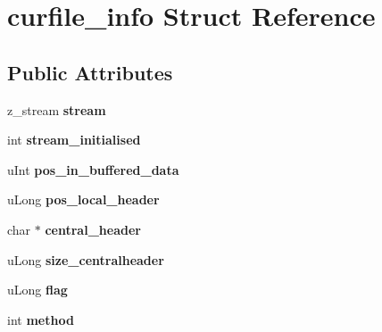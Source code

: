 \hypertarget{structcurfile__info}{\section{curfile\-\_\-info Struct Reference}
\label{structcurfile__info}
}
\subsection*{Public Attributes}
\begin{DoxyCompactItemize}
\item 
\hypertarget{structcurfile__info_a902dbbcce2f8a9b5d5f0ac705f9c914c}{z\-\_\-stream {\bfseries stream}}\label{structcurfile__info_a902dbbcce2f8a9b5d5f0ac705f9c914c}

\item 
\hypertarget{structcurfile__info_a4408645945defb3e3e72fd354d4e98b2}{int {\bfseries stream\-\_\-initialised}}\label{structcurfile__info_a4408645945defb3e3e72fd354d4e98b2}

\item 
\hypertarget{structcurfile__info_ab1e433122ecceb389c8d258830e89f6f}{u\-Int {\bfseries pos\-\_\-in\-\_\-buffered\-\_\-data}}\label{structcurfile__info_ab1e433122ecceb389c8d258830e89f6f}

\item 
\hypertarget{structcurfile__info_ae859aac5711395f5136a26a393f4f3ec}{u\-Long {\bfseries pos\-\_\-local\-\_\-header}}\label{structcurfile__info_ae859aac5711395f5136a26a393f4f3ec}

\item 
\hypertarget{structcurfile__info_a6b8d86737b9297846fc67799c8c42e21}{char $\ast$ {\bfseries central\-\_\-header}}\label{structcurfile__info_a6b8d86737b9297846fc67799c8c42e21}

\item 
\hypertarget{structcurfile__info_a25272deebbc7e9f5f474f4c2b36e27a6}{u\-Long {\bfseries size\-\_\-centralheader}}\label{structcurfile__info_a25272deebbc7e9f5f474f4c2b36e27a6}

\item 
\hypertarget{structcurfile__info_a9484e7dcce78fd7856e3048357115172}{u\-Long {\bfseries flag}}\label{structcurfile__info_a9484e7dcce78fd7856e3048357115172}

\item 
\hypertarget{structcurfile__info_ac69364c19c39e2962e8f247f4b760d5f}{int {\bfseries method}}\label{structcurfile__info_ac69364c19c39e2962e8f247f4b760d5f}


\end{DoxyCompactItemize}
